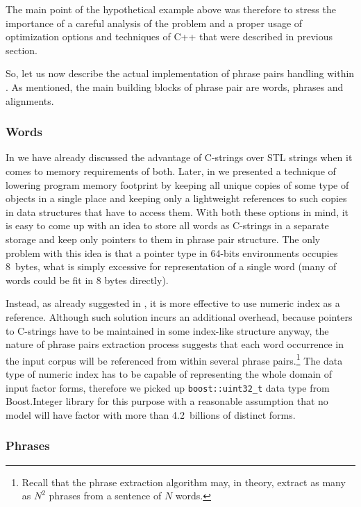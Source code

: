 The main point of the hypothetical example above was therefore to stress the importance of
a careful analysis of the problem and a proper usage of optimization options and techniques
of C++ that were described in previous section.

So, let us now describe the actual implementation of phrase pairs handling within \eppex{}.
As mentioned, the main building blocks of phrase pair are words, phrases and alignments.

\subsubsection*{Words}

In  we have already discussed the advantage of C-strings over STL strings
when it comes to memory requirements of both.
Later, in  we presented a technique of lowering program memory
footprint by keeping all unique copies of some type of objects in a single place and keeping
only a lightweight references to such copies in data structures that have to access them.
With both these options in mind, it is easy to come up with an idea to store all words as
C-strings in a separate storage and keep only pointers to them in phrase pair structure.
The only problem with this idea is that a pointer type in 64-bits environments occupies
8~bytes, what is simply excessive for representation of a single word (many of words could
be fit in 8 bytes directly).

Instead, as already suggested in , it is more effective to
use numeric index as a reference.
Although such solution incurs an additional overhead, because pointers to C-strings have to
be maintained in some index-like structure anyway, the nature of phrase pairs extraction
process suggests that each word occurrence in the input corpus will be referenced from within
several phrase pairs.\footnote{Recall that the phrase extraction algorithm may, in theory,
extract as many as $N^2$ phrases from a sentence of $N$ words.}
The data type of numeric index has to be capable of representing the whole domain of input
factor forms, therefore we picked up \verb|boost::uint32_t| data type from Boost.Integer
library for this purpose with a reasonable assumption that no model will have factor with
more than 4.2~billions of distinct forms.

\subsubsection*{Phrases}

